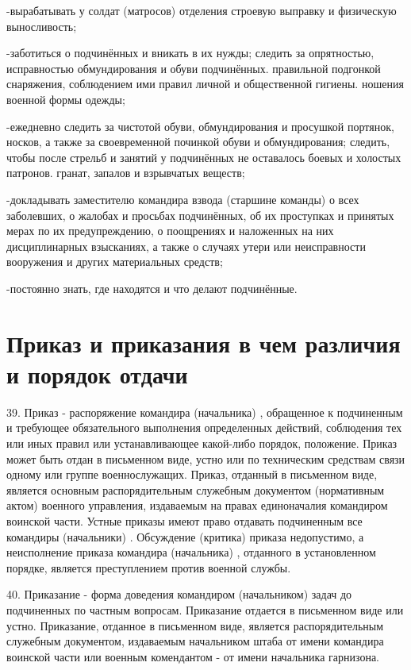\documentclass[12pt,a4paper]{report}
\begin{document}
-вырабатывать  у  солдат (матросов)  отделения  строевую выправку  и  физическую  выносливость;

-заботиться  о  подчинённых  и  вникать  в  их  нужды; следить  за  опрятностью,  исправностью  обмундирования  и  обуви  подчинённых. правильной  подгонкой  снаряжения,  соблюдением  ими  правил  личной  и  общественной  гигиены.  ношения  военной  формы  одежды;

-ежедневно  следить  за  чистотой  обуви,  обмундирования  и  просушкой  портянок,  носков,  а  также  за  своевременной  починкой  обуви  и  обмундирования;
следить,  чтобы  после  стрельб  и  занятий  у  подчинённых  не   оставалось  боевых  и  холостых  патронов.  гранат,  запалов  и  взрывчатых  веществ;

-докладывать заместителю  командира  взвода (старшине  команды)  о  всех  заболевших,  о  жалобах  и  просьбах  подчинённых,  об  их  проступках  и  принятых  мерах  по  их  предупреждению,  о  поощрениях  и  наложенных  на  них  дисциплинарных  взысканиях,  а  также  о  случаях  утери  или  неисправности  вооружения  и  других  материальных  средств;

-постоянно  знать,  где  находятся  и  что  делают  подчинённые.
\section{Приказ и приказания в чем различия и порядок отдачи}
39. Приказ - распоряжение командира (начальника) , обращенное к подчиненным и требующее обязательного выполнения определенных действий, соблюдения тех или иных правил или устанавливающее какой-либо порядок, положение. 
Приказ может быть отдан в письменном виде, устно или по техническим средствам связи одному или группе военнослужащих. Приказ, отданный в письменном виде, является основным распорядительным служебным документом (нормативным актом) военного управления, издаваемым на правах единоначалия командиром воинской части. Устные приказы имеют право отдавать подчиненным все командиры (начальники) . 
Обсуждение (критика) приказа недопустимо, а неисполнение приказа командира (начальника) , отданного в установленном порядке, является преступлением против военной службы. 

40. Приказание - форма доведения командиром (начальником) задач до подчиненных по частным вопросам. Приказание отдается в письменном виде или устно. Приказание, отданное в письменном виде, является распорядительным служебным документом, издаваемым начальником штаба от имени командира воинской части или военным комендантом - от имени начальника гарнизона. 
\end{document}
